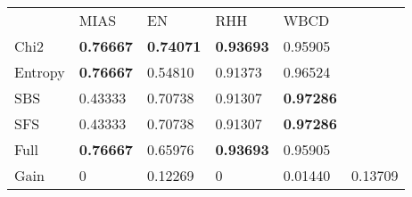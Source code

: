 \begin{tabular}{|l|l|l|l|l|l}
\cline{1-5}
        & MIAS              & EN                & RHH               & WBCD      &         \\
\cline{1-5}
Chi2    & \textbf{0.76667}  & \textbf{0.74071}  & \textbf{0.93693}  & 0.95905           &         \\
Entropy & \textbf{0.76667}  & 0.54810           & 0.91373           & 0.96524           &         \\
SBS     & 0.43333           & 0.70738           & 0.91307           & \textbf{0.97286}  &         \\
SFS     & 0.43333           & 0.70738           & 0.91307           & \textbf{0.97286}  &         \\
Full    & \textbf{0.76667}  & 0.65976           & \textbf{0.93693}  & 0.95905           &         \\
\cline{1-5}
\cline{1-5}
Gain    & 0                 & 0.12269           & 0                 & 0.01440           & 0.13709 \\
\cline{1-5}
\end{tabular}

